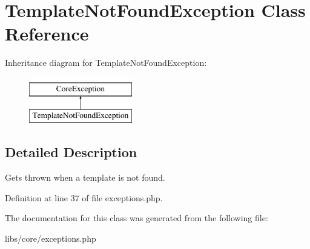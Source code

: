 \hypertarget{class_template_not_found_exception}{\section{\-Template\-Not\-Found\-Exception \-Class \-Reference}
\label{class_template_not_found_exception}
}
\-Inheritance diagram for \-Template\-Not\-Found\-Exception\-:\begin{figure}[H]
\begin{center}
\leavevmode
\includegraphics[height=2.000000cm]{class_template_not_found_exception}
\end{center}
\end{figure}


\subsection{\-Detailed \-Description}
\-Gets thrown when a template is not found. 

\-Definition at line 37 of file exceptions.\-php.



\-The documentation for this class was generated from the following file\-:\begin{DoxyCompactItemize}
\item 
libs/core/exceptions.\-php\end{DoxyCompactItemize}
